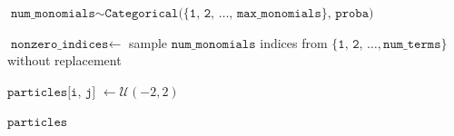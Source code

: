 \documentclass[11pt]{article}
\begin{document}
\begin{algorithm}
\begin{algorithmic}[1]
		\State $\texttt{num\_monomials} \sim \texttt{Categorical(\{1, 2, \ldots, max\_monomials\}, proba)}$ 
		
		\State $\texttt{nonzero\_indices}\leftarrow$ sample $\texttt{num\_monomials}$ indices from $\{\texttt{1, 2, }\ldots, \texttt{num\_terms}\}$ without replacement 
		
		 
		\State $\texttt{particles[i, j] }\leftarrow \mathcal{U}(-2,2)$ 
		\EndFor
		\EndFor
		
		\Return $\texttt{particles}$
	\end{algorithmic}
\end{algorithm}
\end{document}
